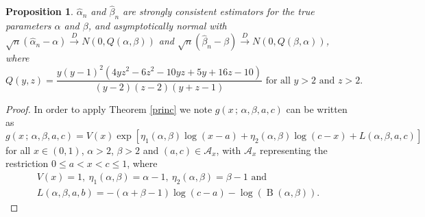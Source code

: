 \documentclass[10pt,a4paper,onecolumn]{article} %
\newtheorem{proposition}[theorem]{Proposition}
\newcommand{\on}{\operatorname}
\begin{document}
\begin{proposition} $\hat\alpha_n$ and $\hat\beta_n$ are strongly consistent estimators for the true parameters $\alpha$ and $\beta$, and asymptotically normal with $\sqrt{n}\left(\hat{\alpha}_n-\alpha\right)\overset{D}{\to} N\left(0,Q(\alpha,\beta)\right)$ and $\sqrt{n}\left(\hat{\beta}_n-\beta\right)\overset{D}{\to} N\left(0,Q(\beta,\alpha)\right)$, where
\begin{equation*}Q(y,z) = \frac{y(y - 1)^2(4yz^2 - 6z^2 - 10yz + 5y + 16z  - 10)}{(y - 2)(z - 2)(y + z - 1)}\mbox{ for all }y>2\mbox{ and }z>2.
\end{equation*}

\end{proposition}
\begin{proof} In order to apply Theorem \ref{princ}
we note $g(x\,;\,\alpha,\beta,a,c)$ can be written as \begin{equation*} g(x\,;\,\alpha,\beta,a,c)=V(x)\exp\left[\eta_1(\alpha,\beta)\log(x-a)+\eta_2(\alpha,\beta)\log(c-x)+L(\alpha,\beta,a,c)\right]
\end{equation*}
for all $x\in(0,1)$, $\alpha>2$, $\beta>2$ and $(a,c)\in\mathcal{A}_x$, with $\mathcal{A}_x$ representing the restriction $0\leq a<x<c\leq 1$, where
\begin{equation*}
\begin{aligned}V(x)=1,\ \eta_1(\alpha,\beta)=\alpha-1,\ \eta_2(\alpha,\beta)=\beta-1\mbox{ and }\\
L(\alpha,\beta,a,b)=-(\alpha+\beta-1)\log(c-a)-\log(\on{B}(\alpha,\beta)).
\end{aligned} 
\end{equation*}


\end{proof}
\end{document}
